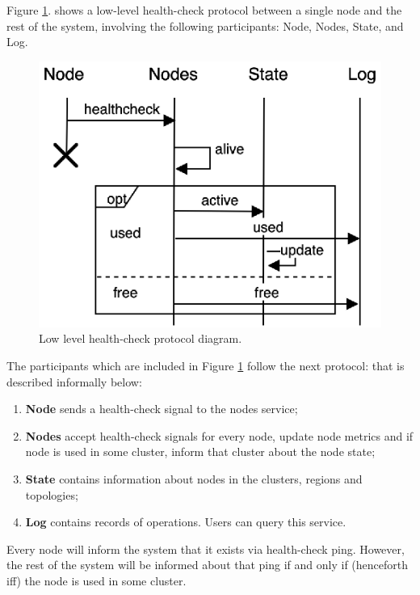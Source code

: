 Figure \ref{fig:fig6}. shows a low-level health-check protocol between a single node and the rest of the system, involving the following participants: Node, Nodes, State, and Log.

\begin{figure}[H]
	\begin{center}
		\includegraphics[scale=0.75]{images/FIG2}
	\end{center}
	\vspace{-0.7cm}
	\caption{Low level health-check protocol diagram.}
	\label{fig:fig6}
\end{figure} 

The participants which are included in Figure \ref{fig:fig6} follow the next protocol:\label{informal_description_health-check} that is described informally below:

\begin{enumerate}[start=1,label={(\bfseries \arabic*)}]
	\item \textbf{Node} sends a health-check signal to the nodes service;
	\item \textbf{Nodes} accept health-check signals for every node, update node metrics and if node is used in some cluster, inform that cluster about the node state;
	\item \textbf{State} contains information about nodes in the clusters, regions and topologies;
	\item \textbf{Log} contains records of operations. Users can query this service. 
\end{enumerate}

Every node will inform the system that it exists via health-check ping. However, the rest of the system will be informed about that ping if and only if (henceforth iff) the node is used in some cluster. 

